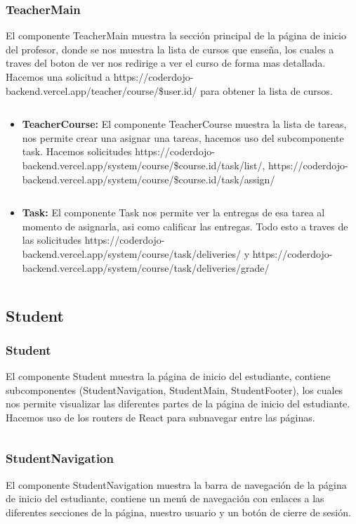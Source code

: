 \documentclass{article}
\begin{document}
\subsubsection{TeacherMain}
El componente TeacherMain muestra la sección principal de la página de inicio del profesor, donde se nos muestra la lista de cursos que enseña, los cuales a traves del boton de ver nos redirige a ver el curso de forma mas detallada. Hacemos una solicitud a https://coderdojo-backend.vercel.app/teacher/course/\${user.id}/ para obtener la lista de cursos.
\inputminted{javascript}{../fronted/src/designUI/Teacher/TeacherMain.jsx}

\begin{itemize}
	\item \textbf{TeacherCourse:} El componente TeacherCourse muestra la lista de tareas, nos permite crear una asignar una tareas, hacemos uso del subcomponente task. Hacemos solicitudes https://coderdojo-backend.vercel.app/system/course/\${course.id}/task/list/, https://coderdojo-backend.vercel.app/system/course/\${course.id}/task/assign/\newline
	      \inputminted{javascript}{../fronted/src/designUI/Teacher/TeacherCourse.jsx}
	\item \textbf{Task:} El componente Task nos permite ver la entregas de esa tarea al momento de asignarla, asi como calificar las entregas. Todo esto a traves de las solicitudes https://coderdojo-backend.vercel.app/system/course/task/deliveries/ y https://coderdojo-backend.vercel.app/system/course/task/deliveries/grade/\newline
	      \inputminted{javascript}{../fronted/src/designUI/Teacher/Task.jsx}
\end{itemize}

\subsection{Student}
\subsubsection{Student}
El componente Student muestra la página de inicio del estudiante, contiene subcomponentes (StudentNavigation, StudentMain, StudentFooter), los cuales nos permite visualizar las diferentes partes de la página de inicio del estudiante. Hacemos uso de los routers de React para subnavegar entre las páginas.
\inputminted{javascript}{../fronted/src/designUI/Student/Student.jsx}
\subsubsection{StudentNavigation}
El componente StudentNavigation muestra la barra de navegación de la página de inicio del estudiante, contiene un menú de navegación con enlaces a las diferentes secciones de la página, nuestro usuario y un botón de cierre de sesión.
\inputminted{javascript}{../fronted/src/designUI/Student/StudentNavigation.jsx}
\end{document}
